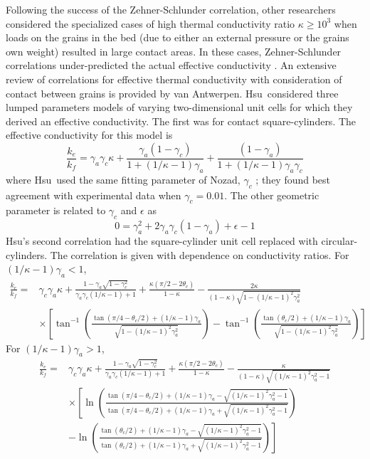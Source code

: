 Following the success of the Zehner-Schlunder correlation, other researchers considered the specialized cases of high thermal conductivity ratio $\kappa \ge 10^3$ when loads on the grains in the bed (due to either an external pressure or the grains own weight) resulted in large contact areas. In these cases, Zehner-Schlunder correlations under-predicted the actual effective conductivity \cite{Aichlmayr2005a}. An extensive review of correlations for effective thermal conductivity with consideration of contact between grains is provided by van Antwerpen\etal \cite{VanAntwerpen2010}. Hsu\etal~considered three lumped parameters models of varying two-dimensional unit cells for which they derived an effective conductivity.\cite{Bay1995} The first was for contact square-cylinders. The effective conductivity for this model is
\begin{equation}
    \frac{k_e}{k_f} = \gamma_a\gamma_c\kappa + \frac{\gamma_a(1-\gamma_c)}{1+(1/\kappa-1)\gamma_a} + \frac{(1-\gamma_a)}{1+(1/\kappa-1)\gamma_a\gamma_c}
\end{equation}
where Hsu\etal~used the same fitting parameter of Nozad\etal, $\gamma_c$ \cite{Nozad1985}; they found best agreement with experimental data when $\gamma_c = 0.01$. The other geometric parameter is related to $\gamma_c$ and $\epsilon$ as
\begin{equation}
    0=\gamma_a^2 + 2\gamma_a\gamma_c(1-\gamma_a) + \epsilon - 1
\end{equation}
Hsu\etal's second correlation had the square-cylinder unit cell replaced with circular-cylinders. The correlation is given with dependence on conductivity ratios. For $(1/\kappa-1)\gamma_a < 1$,
\begin{equation}
\begin{split}
    \frac{k_e}{k_f} ={} &\gamma_c\gamma_a\kappa + \frac{1-\gamma_a\sqrt{1-\gamma_c^2}}{\gamma_a\gamma_c(1/\kappa-1)+1} + \frac{\kappa(\pi/2 - 2\theta_c)}{1-\kappa} - \frac{2\kappa}{(1-\kappa)\sqrt{1-(1/\kappa-1)^2\gamma_a^2}}\\
    &\times\left[\tan^{-1}\left(\frac{\tan(\pi/4 - \theta_c/2)+(1/\kappa-1)\gamma_a}{\sqrt{1-(1/\kappa-1)^2\gamma_a^2}} \right) - \tan^{-1}\left(\frac{\tan(\theta_c/2)+(1/\kappa-1)\gamma_a}{\sqrt{1-(1/\kappa-1)^2\gamma_a^2}}\right) \right]
\end{split}
\end{equation}
For $(1/\kappa-1)\gamma_a>1$,
\begin{equation}
\begin{split}
    \frac{k_e}{k_f} ={} &\gamma_c\gamma_a\kappa + \frac{1-\gamma_a\sqrt{1-\gamma_c^2}}{\gamma_a\gamma_c(1/\kappa-1)+1} + \frac{\kappa(\pi/2 - 2\theta_c)}{1-\kappa} - \frac{\kappa}{(1-\kappa)\sqrt{(1/\kappa-1)^2\gamma_a^2-1}}\\
    & \times\left[\ln\left(\frac{\tan(\pi/4 - \theta_c/2)+(1/\kappa-1)\gamma_a - \sqrt{(1/\kappa-1)^2\gamma_a^2-1}}{\tan(\pi/4-\theta_c/2) +(1/\kappa-1)\gamma_a+\sqrt{(1/\kappa-1)^2\gamma_a^2-1}} \right) \right.\\
    & -\left.\ln\left(\frac{\tan(\theta_c/2)+(1/\kappa-1)\gamma_a - \sqrt{(1/\kappa-1)^2\gamma_a^2-1}}{\tan(\theta_c/2) +(1/\kappa-1)\gamma_a+\sqrt{(1/\kappa-1)^2\gamma_a^2-1}} \right) \right]
\end{split}
\end{equation}
